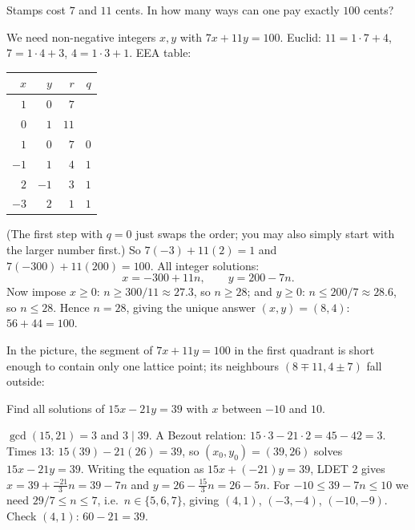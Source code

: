 \begin{example}
Stamps cost $7$ and $11$ cents. In how many ways can one pay exactly $100$ cents?

We need non-negative integers $x,y$ with $7x + 11y = 100$. Euclid: $11 = 1\cdot 7 + 4$,
$7 = 1\cdot 4 + 3$, $4 = 1 \cdot 3 + 1$. EEA table:
\begin{center}
\begin{tabular}{rrrr}
\toprule
$x$ & $y$ & $r$ & $q$\\
\midrule
$1$ & $0$ & $7$ & \\
$0$ & $1$ & $11$ & \\
$1$ & $0$ & $7$ & $0$\\
$-1$ & $1$ & $4$ & $1$\\
$2$ & $-1$ & $3$ & $1$\\
$-3$ & $2$ & $1$ & $1$\\
\bottomrule
\end{tabular}
\end{center}
(The first step with $q = 0$ just swaps the order; you may also simply start with the larger
number first.) So $7(-3) + 11(2) = 1$ and $7(-300) + 11(200) = 100$. All integer solutions:
\[ x = -300 + 11n,\qquad y = 200 - 7n. \]
Now impose $x \ge 0$: $n \ge 300/11 \approx 27.3$, so $n \ge 28$; and $y \ge 0$:
$n \le 200/7 \approx 28.6$, so $n \le 28$. Hence $n = 28$, giving the unique answer
$(x,y) = (8, 4)$: $56 + 44 = 100$.
\end{example}

In the picture, the segment of $7x + 11y = 100$ in the first quadrant is short enough to
contain only one lattice point; its neighbours $(8 \mp 11, 4 \pm 7)$ fall outside:
\begin{center}
\end{center}

\begin{example}
Find all solutions of $15x - 21y = 39$ with $x$ between $-10$ and $10$.

$\gcd(15,21) = 3$ and $3 \mid 39$. A Bezout relation: $15\cdot 3 - 21\cdot 2 = 45 - 42 = 3$. Times
$13$: $15(39) - 21(26) = 39$, so $(x_0,y_0) = (39, 26)$ solves $15x - 21y = 39$. Writing the
equation as $15x + (-21)y = 39$, LDET 2 gives $x = 39 + \frac{-21}{3}n = 39 - 7n$ and
$y = 26 - \frac{15}{3}n = 26 - 5n$. For $-10 \le 39 - 7n \le 10$ we need $29/7 \le n \le 7$,
i.e.\ $n \in \{5,6,7\}$, giving $(4,1)$, $(-3,-4)$, $(-10,-9)$. Check $(4,1)$: $60 - 21 = 39$.
\end{example}

